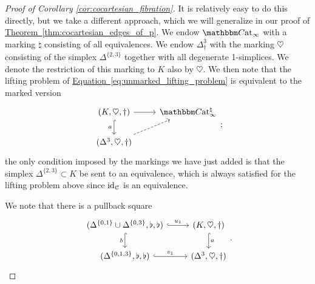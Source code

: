 \documentclass[main.tex]{subfiles}
\begin{document}
\begin{proof}[Proof of Corollary \ref{cor:cocartesian_fibration}]
  It is relatively easy to do this directly, but we take a different approach, which we will generalize in our proof of \hyperref[thm:cocartesian_edges_of_p]{Theorem~\ref*{thm:cocartesian_edges_of_p}}. We endow $\ICCat$ with a marking $\natural$ consisting of all equivalences. We endow $\Delta^{3}_{\dagger}$ with the marking $\heartsuit$ consisting of the simplex $\Delta^{\{2,3\}}$ together with all degenerate 1-simplices. We denote the restriction of this marking to $K$ also by $\heartsuit$. We then note that the lifting problem of \hyperref[eq:unmarked_lifting_problem]{Equation~\ref*{eq:unmarked_lifting_problem}} is equivalent to the marked version
  \begin{equation*}
    \begin{tikzcd}
      (K, \heartsuit, \dagger)
      \arrow[d, hook, swap, "a"]
      \arrow[r]
      & \ICCat^{\natural}
      \\
      (\Delta^{3}, \heartsuit, \dagger)
      \arrow[ur, dashed]
    \end{tikzcd};
  \end{equation*}
  the only condition imposed by the markings we have just added is that the simplex $\Delta^{\{2,3\}} \subset K$ be sent to an equivalence, which is always satisfied for the lifting problem above since $\mathrm{id}_{\mathcal{C}}$ is an equivalence.

  We note that there is a pullback square
  \begin{equation*}
    \begin{tikzcd}
      (\Delta^{\{0,1\}} \cup \Delta^{\{0,3\}}, \flat, \flat)
      \arrow[r, hook, "u_{1}"]
      \arrow[d, hook, swap, "b"]
      & (K, \heartsuit, \dagger)
      \arrow[d, hook, "a"]
      \\
      (\Delta^{\{0,1,3\}}, \flat, \flat)
      \arrow[r, hook, "v_{1}"]
      & (\Delta^{3}, \heartsuit, \dagger)
    \end{tikzcd}.
  \end{equation*}


\end{proof}
\end{document}
